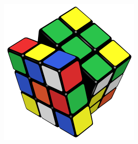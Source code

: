 \documentclass{beamer}
\begin{document}
\begin{frame}
\begin{columns}[c]
\begin{column}{.45\textwidth}
\begin{center}
                    \includegraphics[width=\textwidth]{images/rubik}
                \end{center}
            \end{column}
        \end{columns}
    \end{frame}
\end{document}

